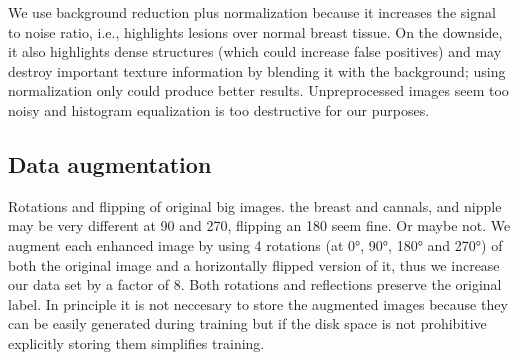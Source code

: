 We use background reduction plus normalization because it increases the signal to noise ratio, i.e., highlights lesions over normal breast tissue. On the downside, it also highlights dense structures (which could increase false positives) and may destroy important texture information by blending it with the background; using normalization only could produce better results. Unpreprocessed images seem too noisy and histogram equalization is too destructive for our purposes.


	
\subsection{Data augmentation}
Rotations and flipping of original big images. the breast and cannals, and nipple may be very different at 90 and 270, flipping an 180 seem fine. Or maybe not.
We augment each enhanced image by using 4 rotations (at 0°, 90°, 180° and 270°) of both the original image and a horizontally flipped version of it, thus we increase our data set by a factor of 8. Both rotations and reflections preserve the original label. In principle it is not neccesary to store the augmented images because they can be easily generated during training but if the disk space is not prohibitive explicitly storing them simplifies training.

